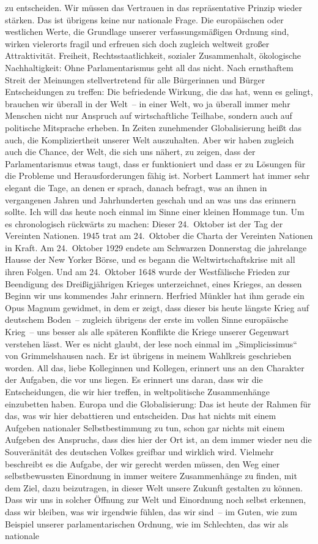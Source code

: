 \documentclass[a4paper,11pt]{article}
\begin{document}
zu entscheiden. Wir müssen das Vertrauen in das repräsentative Prinzip wieder stärken. Das ist übrigens keine nur nationale Frage. Die europäischen oder westlichen Werte, die Grundlage unserer verfassungsmäßigen Ordnung sind, wirken vielerorts fragil und erfreuen sich doch zugleich weltweit großer Attraktivität. Freiheit, Rechtsstaatlichkeit, sozialer Zusammenhalt, ökologische Nachhaltigkeit: Ohne Parlamentarismus geht all das nicht. Nach ernsthaftem Streit der Meinungen stellvertretend für alle Bürgerinnen und Bürger Entscheidungen zu treffen: Die befriedende Wirkung, die das hat, wenn es gelingt, brauchen wir überall in der Welt – in einer Welt, wo ja überall immer mehr Menschen nicht nur Anspruch auf wirtschaftliche Teilhabe, sondern auch auf politische Mitsprache erheben. In Zeiten zunehmender Globalisierung heißt das auch, die Kompliziertheit unserer Welt auszuhalten. Aber wir haben zugleich auch die Chance, der Welt, die sich uns nähert, zu zeigen, dass der Parlamentarismus etwas taugt, dass er funktioniert und dass er zu Lösungen für die Probleme und Herausforderungen fähig ist. Norbert Lammert hat immer sehr elegant die Tage, an denen er sprach, danach befragt, was an ihnen in vergangenen Jahren und Jahrhunderten geschah und an was uns das erinnern sollte. Ich will das heute noch einmal im Sinne einer kleinen Hommage tun. Um es chronologisch rückwärts zu machen: Dieser 24. Oktober ist der Tag der Vereinten Nationen. 1945 trat am 24. Oktober die Charta der Vereinten Nationen in Kraft. Am 24. Oktober 1929 endete am Schwarzen Donnerstag die jahrelange Hausse der New Yorker Börse, und es begann die Weltwirtschaftskrise mit all ihren Folgen. Und am 24. Oktober 1648 wurde der Westfälische Frieden zur Beendigung des Dreißigjährigen Krieges unterzeichnet, eines Krieges, an dessen Beginn wir uns kommendes Jahr erinnern. Herfried Münkler hat ihm gerade ein Opus Magnum gewidmet, in dem er zeigt, dass dieser bis heute längste Krieg auf deutschem Boden – zugleich übrigens der erste im vollen Sinne europäische Krieg – uns besser als alle späteren Konflikte die Kriege unserer Gegenwart verstehen lässt. Wer es nicht glaubt, der lese noch einmal im „Simplicissimus“ von ­Grimmelshausen nach. Er ist übrigens in meinem Wahlkreis geschrieben worden. All das, liebe Kolleginnen und Kollegen, erinnert uns an den Charakter der Aufgaben, die vor uns liegen. Es erinnert uns daran, dass wir die Entscheidungen, die wir hier treffen, in weltpolitische Zusammenhänge einzubetten haben. Europa und die Globalisierung: Das ist heute der Rahmen für das, was wir hier debattieren und entscheiden. Das hat nichts mit einem Aufgeben nationaler Selbstbestimmung zu tun, schon gar nichts mit einem Aufgeben des Anspruchs, dass dies hier der Ort ist, an dem immer wieder neu die Souveränität des deutschen Volkes greifbar und wirklich wird. Vielmehr beschreibt es die Aufgabe, der wir gerecht werden müssen, den Weg einer selbstbewussten Einordnung in immer weitere Zusammenhänge zu finden, mit dem Ziel, dazu beizutragen, in dieser Welt unsere Zukunft gestalten zu können. Dass wir uns in solcher Öffnung zur Welt und Einordnung noch selbst erkennen, dass wir bleiben, was wir irgendwie fühlen, das wir sind – im Guten, wie zum Beispiel unserer parlamentarischen Ordnung, wie im Schlechten, das wir als nationale 
\end{document}
